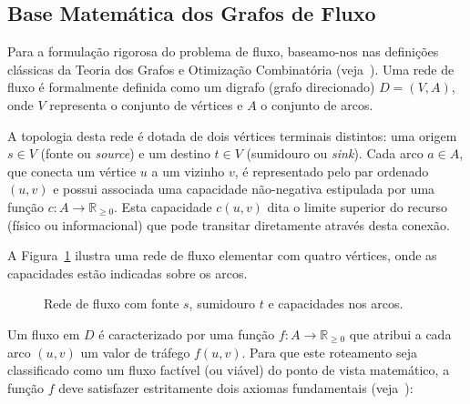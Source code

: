 \documentclass[12pt,a4paper]{article}
\begin{document}
\subsection{Base Matemática dos Grafos de Fluxo}

Para a formulação rigorosa do problema de fluxo, baseamo-nos nas definições clássicas da Teoria dos Grafos e Otimização Combinatória (veja~\cite{ahuja1993network, bondy2008graph}). Uma rede de fluxo é formalmente definida como um digrafo (grafo direcionado) $D = (V, A)$, onde $V$ representa o conjunto de vértices e $A$ o conjunto de arcos.

A topologia desta rede é dotada de dois vértices terminais distintos: uma origem $s \in V$ (fonte ou \textit{source}) e um destino $t \in V$ (sumidouro ou \textit{sink}). Cada arco $a \in A$, que conecta um vértice $u$ a um vizinho $v$, é representado pelo par ordenado $(u,v)$ e possui associada uma capacidade não-negativa estipulada por uma função $c: A \rightarrow \mathbb{R}_{\ge 0}$. Esta capacidade $c(u,v)$ dita o limite superior do recurso (físico ou informacional) que pode transitar diretamente através desta conexão.

A Figura~\ref{fig:rede_fluxo_basica} ilustra uma rede de fluxo elementar com quatro vértices, onde as capacidades estão indicadas sobre os arcos.

\begin{figure}[h]
\centering
{}
\caption{Rede de fluxo com fonte $s$, sumidouro $t$ e capacidades nos arcos.}
\label{fig:rede_fluxo_basica}
\end{figure}

Um fluxo em $D$ é caracterizado por uma função $f: A \rightarrow \mathbb{R}_{\ge 0}$ que atribui a cada arco $(u,v)$ um valor de tráfego $f(u,v)$. Para que este roteamento seja classificado como um fluxo factível (ou viável) do ponto de vista matemático, a função $f$ deve satisfazer estritamente dois axiomas fundamentais (veja~\cite{ford1956maximal, cook1998combinatorial}):
\end{document}
